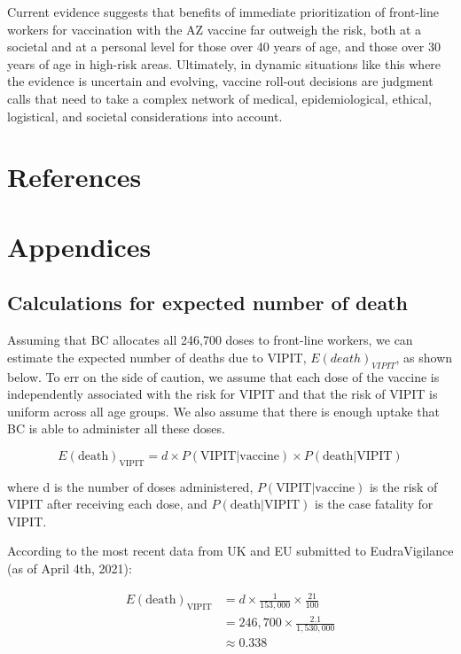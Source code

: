 \documentclass[]{elsarticle} %
\begin{document}
Current evidence suggests that benefits of immediate prioritization of
front-line workers for vaccination with the AZ vaccine far outweigh the
risk, both at a societal and at a personal level for those over 40 years
of age, and those over 30 years of age in high-risk areas. Ultimately,
in dynamic situations like this where the evidence is uncertain and
evolving, vaccine roll-out decisions are judgment calls that need to
take a complex network of medical, epidemiological, ethical, logistical,
and societal considerations into account.

\hypertarget{references}{%
\section*{References}\label{references}}

\newpage

\hypertarget{appendices}{%
\section{Appendices}\label{appendices}}

\hypertarget{calculations-for-expected-number-of-death}{%
\subsection{Calculations for expected number of
death}\label{calculations-for-expected-number-of-death}}

Assuming that BC allocates all 246,700 doses to front-line workers, we
can estimate the expected number of deaths due to VIPIT,
\(E(death)_{VIPIT}\), as shown below. To err on the side of caution, we
assume that each dose of the vaccine is independently associated with
the risk for VIPIT and that the risk of VIPIT is uniform across all age
groups. We also assume that there is enough uptake that BC is able to
administer all these doses.

\[
E(\text{death})_{\text{VIPIT}}  = d \times P(\text{VIPIT}|\text{vaccine}) \times P(\text{death}|\text{VIPIT})
\]

where d is the number of doses administered,
\(P(\text{VIPIT}|\text{vaccine})\) is the risk of VIPIT after receiving
each dose, and \(P(\text{death}|\text{VIPIT})\) is the case fatality for
VIPIT.

According to the most recent data from UK and EU submitted to
EudraVigilance (as of April 4th, 2021):

\[
\begin{aligned}
E(\text{death})_{\text{VIPIT}} & = d \times \frac{1}{153,000} \times \frac{21}{100} \\
& = 246,700 \times \frac{2.1}{1,530,000} \\
& \approx 0.338
\end{aligned}
\]
\end{document}
